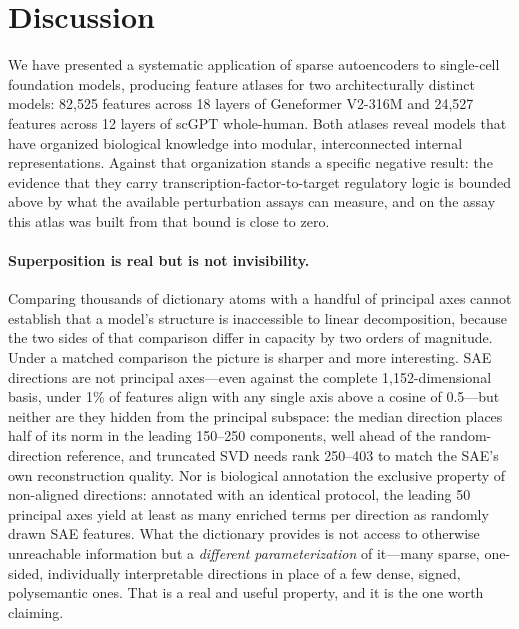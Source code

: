 \documentclass[onecolumn,11pt]{article}
\begin{document}

\section{Discussion}
We have presented a systematic application of sparse autoencoders to single-cell foundation models,
producing feature atlases for two architecturally distinct models: 82,525 features across 18 layers
of Geneformer V2-316M and 24,527 features across 12 layers of scGPT whole-human. Both atlases
reveal models that have organized biological knowledge into modular, interconnected internal
representations. Against that organization stands a specific negative result: the evidence that they carry
transcription-factor-to-target regulatory logic is bounded above by what the available perturbation
assays can measure, and on the assay this atlas was built from that bound is close to zero.

\paragraph{Superposition is real but is not invisibility.}
Comparing thousands of dictionary atoms with a handful of principal axes cannot establish that a
model's structure is inaccessible to linear decomposition, because the two sides of that comparison
differ in capacity by two orders of magnitude. Under a matched comparison the picture is sharper and
more interesting. SAE directions are not principal axes---even against the complete
1,152-dimensional basis, under 1\% of features align with any single axis above a cosine of 0.5---but
neither are they hidden from the principal subspace: the median direction places half of its norm
in the leading 150--250 components, well ahead of the random-direction reference, and truncated SVD
needs rank 250--403 to match the SAE's own reconstruction quality. Nor is biological annotation the
exclusive property of non-aligned directions: annotated with an identical protocol, the leading 50
principal axes yield at least as many enriched terms per direction as randomly drawn SAE features.
What the dictionary provides is not access to otherwise unreachable information but a
\emph{different parameterization} of it---many sparse, one-sided, individually interpretable
directions in place of a few dense, signed, polysemantic ones. That is a real and useful property,
and it is the one worth claiming.
\end{document}
